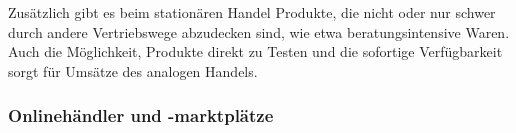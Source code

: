 \begin{folding}
Zusätzlich gibt es beim stationären Handel Produkte, die nicht oder nur schwer durch andere Vertriebswege abzudecken sind, wie etwa beratungsintensive Waren. Auch die Möglichkeit, Produkte direkt zu Testen und die sofortige Verfügbarkeit sorgt für Umsätze des analogen Handels\cite[S. 2]{Maier}.



\end{folding}

\begin{folding} \subsubsection{Onlinehändler und -marktplätze}


\end{folding}
